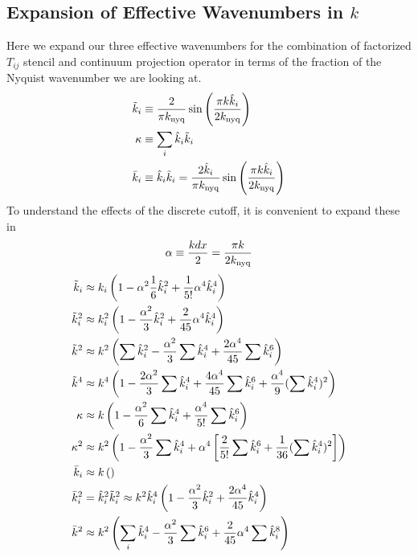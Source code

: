 \documentclass{revtex4}
\begin{document}
\subsection{Expansion of Effective Wavenumbers in $k$}
Here we expand our three effective wavenumbers for the combination of factorized $T_{ij}$ stencil and continuum projection operator in terms of the fraction of the Nyquist wavenumber we are looking at.
\begin{subequations}
  \begin{align}
    \tilde{k}_i &\equiv \frac{2}{\pi k_{\rm nyq}}\sin\left(\frac{\pi k\hat{k}_i}{2k_{\rm nyq}}\right) \\
    \kappa &\equiv \sum_i \hat{k}_i\tilde{k}_i \\
    \bar{k}_i &\equiv \hat{k}_i\tilde{k}_i = \frac{2\hat{k}_i}{\pi k_{\rm nyq}}\sin\left(\frac{\pi k\hat{k}_i}{2k_{\rm nyq}}\right)
  \end{align}
\end{subequations}
To understand the effects of the discrete cutoff, it is convenient to expand these in
\begin{equation}
  \alpha \equiv \frac{kdx}{2} = \frac{\pi k}{2k_{\rm nyq}}
\end{equation}
\begin{subequations}
\begin{align}
  \tilde{k}_i    &\approx k_i\left(1 - \alpha^2\frac{1}{6}\hat{k}_i^2 + \frac{1}{5!}\alpha^4 \hat{k}_i^4 \right)  \\
  \tilde{k}_i^2  &\approx k_i^2\left(1 -\frac{\alpha^2}{3}\hat{k}_i^2 + \frac{2}{45}\alpha^4\hat{k}_i^4 \right)  \\
  \tilde{k}^2    &\approx k^2\left(\sum\hat{k}_i^2 - \frac{\alpha^2}{3}\sum\hat{k}_i^4 + \frac{2\alpha^4}{45}\sum\hat{k}_i^6 \right) \\
  \tilde{k}^4    &\approx k^4\left(1-\frac{2\alpha^2}{3}\sum\hat{k}_i^4 + \frac{4\alpha^4}{45}\sum\hat{k}_i^6 + \frac{\alpha^4}{9}(\sum\hat{k}_i^4)^2\right) \\
  \kappa       &\approx k\left(1 - \frac{\alpha^2}{6}\sum\hat{k}_i^4 + \frac{\alpha^4}{5!}\sum\hat{k}_i^6 \right)   \\
  \kappa^2     &\approx k^2\left(1 - \frac{\alpha^2}{3}\sum\hat{k}_i^4 + \alpha^4\left[\frac{2}{5!}\sum\hat{k}_i^6 + \frac{1}{36}(\sum\hat{k}_i^4)^2\right]\right)  \\
  \bar{k}_i     &\approx k\left(\right)   \\
  \bar{k}_i^2   &= \hat{k}_i^2\tilde{k}_i^2 \approx k^2\hat{k}_i^4\left(1-\frac{\alpha^2}{3}\hat{k}_i^2 + \frac{2\alpha^4}{45}\hat{k}_i^4\right)  \\
  \bar{k}^2     &\approx k^2\left(\sum_i\hat{k}_i^4 - \frac{\alpha^2}{3}\sum\hat{k}_i^6 + \frac{2}{45}\alpha^4\sum\hat{k}_i^8 \right)
\end{align}
\end{subequations}
\end{document}
